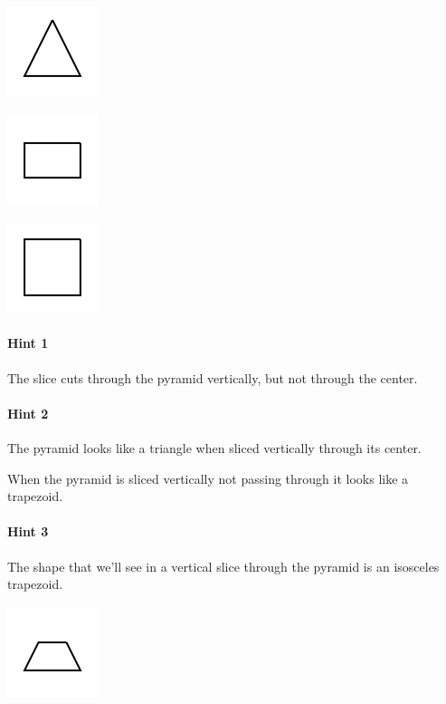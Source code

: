 \documentclass[twocolumn,10pt]{article}
\def\shrinkfactor{0.55}
\begin{document}
 
\includegraphics[scale=\shrinkfactor]{figures/d443e0deb4dc18ef30fbf9139d310266f460b66b.png}


\includegraphics[scale=\shrinkfactor]{figures/0e5042b475e0847d67b74c0482f8e8173f798656.png}


\includegraphics[scale=\shrinkfactor]{figures/4b59a0ece6acc7c19c389e1de534d1df93bf1169.png}



\paragraph{Hint 1}The slice cuts through the pyramid vertically, but not through the center.

\paragraph{Hint 2}The pyramid looks like a triangle when sliced vertically through its center.

When the pyramid is sliced vertically not passing through it looks like a trapezoid.

\paragraph{Hint 3}The shape that we'll see in a vertical slice through the pyramid is an isosceles trapezoid.  

\includegraphics[scale=\shrinkfactor]{figures/462dbf19e63d9954ed7a531f7ea0e2b0379d9bb9.png}
\end{document}
